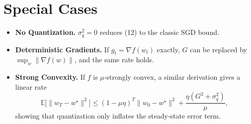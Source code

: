 \documentclass{article}
\newcommand{\E}{\mathbb{E}}
\begin{document}
\section*{Special Cases}
\begin{itemize}
\item \textbf{No Quantization.} $\sigma_{q}^{2}=0$ reduces (12) to the classic SGD bound.
\item \textbf{Deterministic Gradients.} If $g_t=\nabla f(w_t)$ exactly, $G$ can be replaced by $\sup_{w}\|\nabla f(w)\|$, and the same rate holds.
\item \textbf{Strong Convexity.} If $f$ is $\mu$‑strongly convex, a similar derivation gives a linear rate
\[
\E\!\big[\|w_T-w^{\star}\|^{2}\big]\le (1-\mu\eta)^{T}\|w_0-w^{\star}\|^{2}
+\frac{\eta(G^{2}+ \sigma_{q}^{2})}{\mu},
\]
showing that quantization only inflates the steady‑state error term.
\end{itemize}
\end{document}
